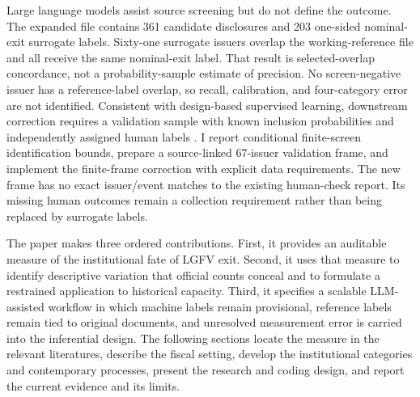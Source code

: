 Large language models assist source screening but do not define the outcome.
The expanded file contains 361 candidate disclosures and 203 one-sided
nominal-exit surrogate labels. Sixty-one surrogate issuers overlap the
working-reference file and all receive the same nominal-exit label. That
result is selected-overlap concordance, not a probability-sample estimate of
precision. No screen-negative issuer has a reference-label overlap, so recall,
calibration, and four-category error are not identified. Consistent with
design-based supervised learning, downstream correction requires a validation
sample with known inclusion probabilities and independently assigned human
labels \citep{egami2023dsl}. I report conditional finite-screen identification
bounds, prepare a source-linked 67-issuer validation frame, and implement the
finite-frame correction with explicit data requirements. The new frame has no
exact issuer/event matches to the existing human-check report. Its missing
human outcomes remain a collection requirement rather than being replaced by
surrogate labels.

The paper makes three ordered contributions. First, it provides an auditable
measure of the institutional fate of LGFV exit. Second, it uses that measure to
identify descriptive variation that official counts conceal and to formulate a
restrained application to historical capacity. Third, it specifies a scalable
LLM-assisted workflow in which machine labels remain provisional, reference
labels remain tied to original documents, and unresolved measurement error is
carried into the inferential design. The following sections locate the measure
in the relevant literatures, describe the fiscal setting, develop the
institutional categories and contemporary processes, present the research and
coding design, and report the current evidence and its limits.
